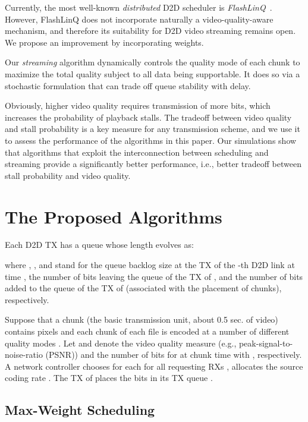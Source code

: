 \documentclass[journal]{IEEEtran}
\begin{document}
Currently, the most well-known \textit{distributed} D2D scheduler is \textit{FlashLinQ}~\cite{ton2013wu}.
However, FlashLinQ does not incorporate naturally a video-quality-aware mechanism, and therefore its suitability for D2D video streaming remains open.
We propose an improvement by incorporating weights.

Our \textit{streaming} algorithm dynamically controls the quality mode of each chunk to maximize the total quality subject to
    all data being supportable. It does so via a stochastic formulation that can trade off queue stability with delay.

Obviously, higher video quality requires transmission of more bits, which  increases the probability of playback stalls. The tradeoff between video quality and stall probability is a key measure for any transmission scheme, and we use it to assess the performance of the algorithms in this paper. Our simulations show that algorithms that exploit the interconnection between scheduling and streaming provide a significantly better performance, i.e., better tradeoff between stall probability and video quality.






\section{The Proposed Algorithms}
Each D2D TX has a queue whose length evolves as:

where , , and  stand for
    the queue backlog size at the TX of the -th D2D link  at time ,
    the number of bits leaving the queue of the TX of ,
    and the number of bits added to the queue of the TX of  (associated with the placement of chunks), respectively.

Suppose that a chunk (the basic transmission unit, about 0.5 sec. of video) contains  pixels and each chunk of each file  is encoded at a number of different quality modes .
Let  and  denote
    the video quality measure (e.g., peak-signal-to-noise-ratio (PSNR))
    and the number of bits for  at chunk time  with , respectively.
A network controller
    chooses  for each  for all requesting RXs ,
    allocates the source coding rate .
The TX of  places the  bits in its TX queue .

 \vspace{-1.0mm}

\subsection{Max-Weight Scheduling}
\end{document}
